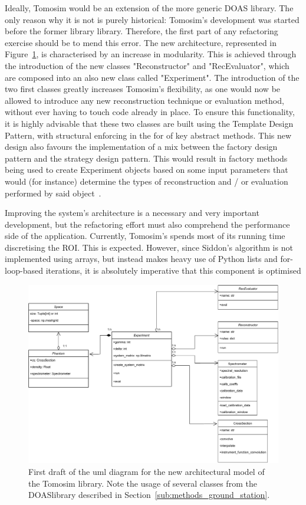 Ideally, Tomosim would be an extension of the more generic \gls{DOAS}
library. The only reason why it is not is purely historical: Tomosim's
development was started before the former library library. Therefore,
the first part of any refactoring exercise should be to mend this error.
The new architecture, represented in Figure~\ref{fig:new_tomosim_uml},
is characterised by an increase in modularity. This is achieved through
the introduction of the new classes "Reconstructor" and "RecEvaluator",
which are composed into an also new class called "Experiment". The
introduction of the two first classes greatly increases Tomosim's
flexibility, as one would now be allowed to introduce any new
reconstruction technique or evaluation method, without ever having to
touch code already in place. To ensure this functionality, it is highly
advisable that these two classes are built using the Template Design
Pattern, with structural enforcing in the for of key abstract methods.
This new design also favours the implementation of a mix between the
factory design pattern and the strategy design pattern. This would
result in factory methods being used to create Experiment objects based
on some input parameters that would (for instance) determine the types
of reconstruction and / or evaluation performed by said
object~.

Improving the system's architecture is  a necessary and very important
development, but the refactoring effort must also comprehend the
performance side of the application. Currently, Tomosim's spends most of
its running time discretising the \gls{ROI}. This is expected. However,
since Siddon's algorithm is not implemented using arrays, but instead
makes heavy use of Python lists and for-loop-based iterations, it is
absolutely imperative that this component is optimised

\begin{figure}[htpb]
    \centering
    \includegraphics[width=.8\textwidth]{img/pdf/newTomosimUML.pdf}
    \caption{First draft of the \gls{uml} diagram for the new
        architectural model of the Tomosim library. Note the usage of
        several classes from the \gls{DOAS}library described in
        Section~\ref{sub:methods_ground_station}.
    }%
    \label{fig:new_tomosim_uml}
\end{figure}
